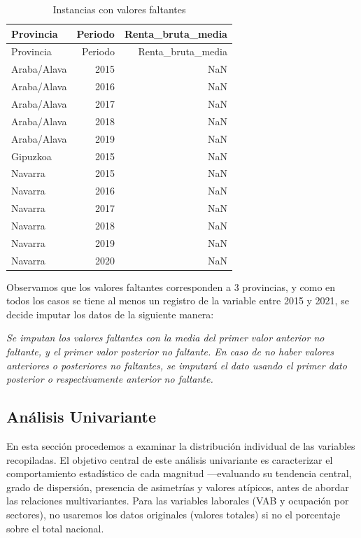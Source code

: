 \documentclass[,article,submit,moreauthors,pdftex]{Definitions/mdpi}
\begin{document}
\begin{longtable}[]{@{}lrr@{}}
\caption{Instancias con valores faltantes}\tabularnewline
\toprule\noalign{}
Provincia & Periodo & Renta\_bruta\_media \\
\midrule\noalign{}
\endfirsthead
\toprule\noalign{}
Provincia & Periodo & Renta\_bruta\_media \\
\midrule\noalign{}
\endhead
\bottomrule\noalign{}
\endlastfoot
Araba/Alava & 2015 & NaN \\
Araba/Alava & 2016 & NaN \\
Araba/Alava & 2017 & NaN \\
Araba/Alava & 2018 & NaN \\
Araba/Alava & 2019 & NaN \\
Gipuzkoa & 2015 & NaN \\
Navarra & 2015 & NaN \\
Navarra & 2016 & NaN \\
Navarra & 2017 & NaN \\
Navarra & 2018 & NaN \\
Navarra & 2019 & NaN \\
Navarra & 2020 & NaN \\
\end{longtable}

Observamos que los valores faltantes corresponden a 3 provincias, y como
en todos los casos se tiene al menos un registro de la variable entre
2015 y 2021, se decide imputar los datos de la siguiente manera:

\emph{Se imputan los valores faltantes con la media del primer valor
anterior no faltante, y el primer valor posterior no faltante. En caso
de no haber valores anteriores o posteriores no faltantes, se imputará
el dato usando el primer dato posterior o respectivamente anterior no
faltante.}

\subsection{Análisis Univariante}\label{anuxe1lisis-univariante}

En esta sección procedemos a examinar la distribución individual de las
variables recopiladas. El objetivo central de este análisis univariante
es caracterizar el comportamiento estadístico de cada magnitud
---evaluando su tendencia central, grado de dispersión, presencia de
asimetrías y valores atípicos, antes de abordar las relaciones
multivariantes. Para las variables laborales (VAB y ocupación por
sectores), no usaremos los datos originales (valores totales) si no el
porcentaje sobre el total nacional.
\end{document}
